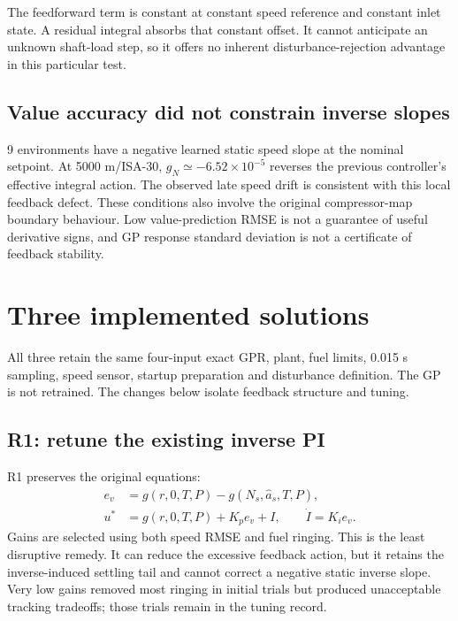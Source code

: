 \documentclass[11pt,a4paper]{article}
\begin{document}
The feedforward term is constant at constant speed reference and constant inlet state. A residual integral absorbs that constant offset. It cannot anticipate an unknown shaft-load step, so it offers no inherent disturbance-rejection advantage in this particular test.

\subsection{Value accuracy did not constrain inverse slopes}
9 environments have a negative learned static speed slope at the nominal setpoint. At 5000 m/ISA-30, $g_N\simeq-6.52\times10^{-5}$ reverses the previous controller's effective integral action. The observed late speed drift is consistent with this local feedback defect. These conditions also involve the original compressor-map boundary behaviour. Low value-prediction RMSE is not a guarantee of useful derivative signs, and GP response standard deviation is not a certificate of feedback stability.

\section{Three implemented solutions}
All three retain the same four-input exact GPR, plant, fuel limits, 0.015 s sampling, speed sensor, startup preparation and disturbance definition. The GP is not retrained. The changes below isolate feedback structure and tuning.

\subsection{R1: retune the existing inverse PI}
R1 preserves the original equations:
\begin{align}
e_v&=g(r,0,T,P)-g(N_s,\hat a_s,T,P),\\
u^*&=g(r,0,T,P)+K_pe_v+I,\qquad \dot I=K_i e_v.
\end{align}
Gains are selected using both speed RMSE and fuel ringing. This is the least disruptive remedy. It can reduce the excessive feedback action, but it retains the inverse-induced settling tail and cannot correct a negative static inverse slope. Very low gains removed most ringing in initial trials but produced unacceptable tracking tradeoffs; those trials remain in the tuning record.
\end{document}
